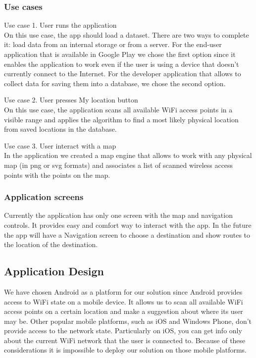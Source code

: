 \documentclass[11pt]{article}
\begin{document}
\subsubsection{Use cases}

Use case 1. User runs the application\\
On this use case, the app should load a dataset. There are two ways to complete it: load data from an internal storage or from a server. For the end-user application that is available in Google Play we chose the first option since it enables the application to work even if the user is using a device that doesn’t currently connect to the Internet. For the developer application that allows to collect data for saving them into a database, we chose the second option.

Use case 2. User presses My location button\\
On this use case, the application scans all available WiFi access points in a visible range and applies the algorithm to find a most likely physical location from saved locations in the database.

Use case 3. User interact with a map\\
In the application we created a map engine that allows to work with any physical map (in png or svg formats) and associates a list of scanned wireless access points with the points on the map.

\subsubsection{Application screens}
Currently the application has only one screen with the map and navigation controls. It provides easy and comfort way to interact with the app. In the future the app will have a Navigation screen to choose a destination and show routes to the location of the destination.

\subsection{Application Design}
We have chosen Android as a platform for our solution since Android provides access to WiFi state on a mobile device. It allows us to scan all available WiFi access points on a certain location and make a suggestion about where its user may be. Other popular mobile platforms, such as iOS and Windows Phone, don’t provide access to the network state. Particularly on iOS, you can get info only about the current WiFi network that the user is connected to. Because of these considerations it is impossible to deploy our solution on those mobile platforms.\\
\end{document}
